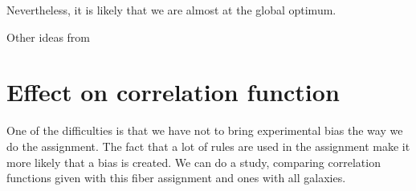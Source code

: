 \documentclass{article}
\begin{document}
Nevertheless, it is likely that we are almost at the global optimum.

Other ideas from \cite{fa}

\section{Effect on correlation function}
One of the difficulties is that we have not to bring experimental bias the way we do the assignment. The fact that a lot of rules are used in the assignment make it more likely that a bias is created.
We can do a study, comparing correlation functions given with this fiber assignment and ones with all galaxies.


{}
\end{document}
